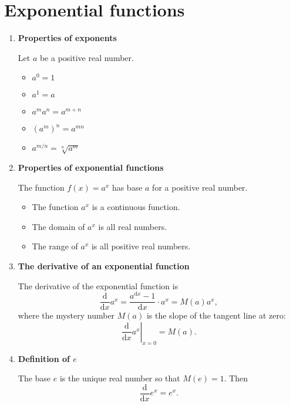 \section{Exponential functions}
\begin{enumerate}
    \item \textbf{Properties of exponents}

        Let $a$ be a positive real number.
        \begin{itemize}
            \item $a^0=1$
            \item $a^1=a$
            \item $a^m a^n=a^{m+n}$
            \item $(a^m)^n=a^{mn}$
            \item $a^{m/n}=\sqrt[n]{a^m}$
        \end{itemize}
    \item \textbf{Properties of exponential functions}

        The function $f(x)=a^x$ has base $a$ for a positive real number.
        \begin{itemize}
            \item The function $a^x$ is a continuous function.
            \item The domain of $a^x$ is all real numbers.
            \item The range of $a^x$ is all positive real numbers.
        \end{itemize}
    \item \textbf{The derivative of an exponential function}

        The derivative of the exponential function is
        $$
        \frac{\mathrm{d}}{\mathrm{d}x}a^x=\frac{a^{\mathrm{d}x}-1}{\mathrm{d}x}\cdot a^x=M(a)a^x,
        $$
        where the mystery number $M(a)$ is the slope of the tangent line at zero:
        $$
        \left.\frac{\mathrm{d}}{\mathrm{d}x}a^x\right|_{x=0}=M(a).
        $$
    \item \textbf{Definition of $e$}
        
        The base $e$ is the unique real number so that $M(e)=1$. Then
        $$
        \frac{\mathrm{d}}{\mathrm{d}x}e^x=e^x.
        $$
\end{enumerate}
